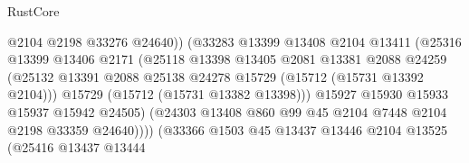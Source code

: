 \begin{lexlean}{RustCore}
\begin{coremodule}
                                        @2104
                                        @2198
                                        @33276
                                        @24640))
                                    (@33283
                                      @13399
                                      @13408
                                      @2104
                                      @13411
                                      (@25316
                                        @13399
                                        @13406
                                        @2171
                                        (@25118
                                          @13398
                                          @13405
                                          @2081
                                          @13381
                                          @2088
                                          @24259
                                          (@25132
                                            @13391
                                            @2088
                                            @25138
                                            @24278
                                            @15729
                                            (@15712 (@15731 @13392 @2104)))
                                          @15729
                                          (@15712 (@15731 @13382 @13398)))
                                        @15927
                                        @15930
                                        @15933
                                        @15937
                                        @15942
                                        @24505)
                                      (@24303
                                        @13408
                                        @860
                                        @99
                                        @45
                                        @2104
                                        @7448
                                        @2104
                                        @2198
                                        @33359
                                        @24640))))
                                (@33366
                                  @1503
                                  @45
                                  @13437
                                  @13446
                                  @2104
                                  @13525
                                  (@25416
                                    @13437
                                    @13444

\end{coremodule}
\end{lexlean}
